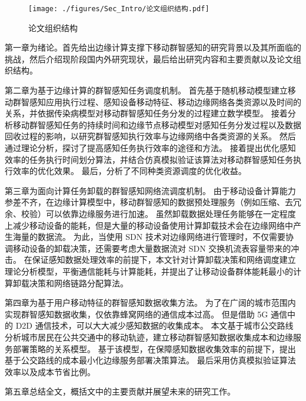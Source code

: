 \begin{figure}[!b]
\vspace{-0.8em}
\centering
  \texttt{[image: ./figures/Sec\_Intro/论文组织结构.pdf]}
  \caption{论文组织结构}
  \vspace{-1em}
  \label{Figure_Re_Instruction}
\end{figure}

第一章为绪论。首先给出边缘计算支撑下移动群智感知的研究背景以及其所面临的挑战，然后介绍现阶段国内外研究现状，最后给出研究内容和主要贡献以及论文组织结构。

第二章为基于边缘计算的群智感知任务调度机制。
首先基于随机移动模型建立移动群智感知应用执行过程、感知设备移动特征、移动边缘网络各类资源以及时间的关系，并依据传染病模型对移动群智感知任务分发的过程建立数学模型。
接着分析移动群智感知任务的持续时间和边缘节点移动模型对感知任务分发过程以及数据回收过程的影响，以研究群智感知执行效率与边缘网络中各类资源的关系。
然后通过理论分析，探讨了提高感知任务执行效率的途径和方法。
接着提出优化感知效率的任务执行时间划分算法，并结合仿真模拟验证该算法对移动群智感知任务执行效率的优化效果。
最后，分析了不同种类资源调度的优化收益。

第三章为面向计算任务卸载的群智感知网络流调度机制。
由于移动设备计算能力参差不齐，在边缘计算模型中，移动群智感知的数据预处理服务（例如压缩、去冗余、校验）可以依靠边缘服务进行加速。
虽然卸载数据处理任务能够在一定程度上减少移动设备的能耗，但是大量的移动设备使用计算卸载技术会在边缘网络中产生海量的数据流。
为此，当使用 SDN 技术对边缘网络进行管理时，不仅需要协调移动设备的卸载决策，还需要考虑大量数据流对 SDN 交换机流表容量带来的冲击。
在保证感知数据处理效率的前提下，本文针对计算卸载决策和网络调度建立理论分析模型，平衡通信能耗与计算能耗，并提出了让移动设备群体能耗最小的计算卸载决策和网络链路分配算法。

第四章为基于用户移动特征的群智感知数据收集方法。
为了在广阔的城市范围内实现群智感知数据收集，仅依靠蜂窝网络的通信成本过高。
但是借助 5G 通信中的 D2D 通信技术，可以大大减少感知数据的收集成本。
本文基于城市公交路线分析城市居民在公共交通中的移动轨迹，建立移动群智感知数据收集成本和边缘服务部署策略的关系模型。
基于该模型，在保障感知数据收集效率的前提下，提出基于公交路线的成本最小化边缘服务部署决策算法。
最后采用仿真模拟验证算法效率以及成本节省比例。

第五章总结全文，概括文中的主要贡献并展望未来的研究工作。

